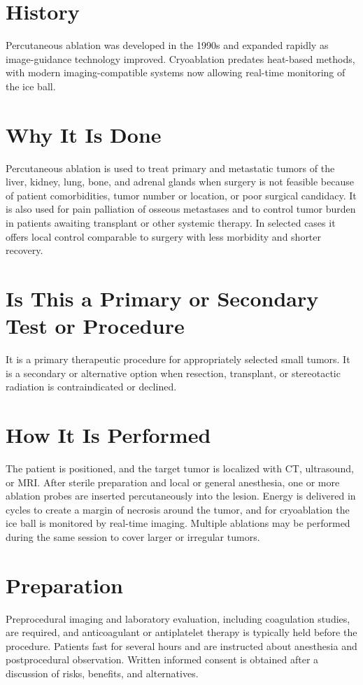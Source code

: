 \section*{History}
Percutaneous ablation was developed in the 1990s and expanded rapidly as image-guidance technology improved. Cryoablation predates heat-based methods, with modern imaging-compatible systems now allowing real-time monitoring of the ice ball.

\section*{Why It Is Done}
Percutaneous ablation is used to treat primary and metastatic tumors of the liver, kidney, lung, bone, and adrenal glands when surgery is not feasible because of patient comorbidities, tumor number or location, or poor surgical candidacy. It is also used for pain palliation of osseous metastases and to control tumor burden in patients awaiting transplant or other systemic therapy. In selected cases it offers local control comparable to surgery with less morbidity and shorter recovery.

\section*{Is This a Primary or Secondary Test or Procedure}
It is a primary therapeutic procedure for appropriately selected small tumors. It is a secondary or alternative option when resection, transplant, or stereotactic radiation is contraindicated or declined.

\section*{How It Is Performed}
The patient is positioned, and the target tumor is localized with CT, ultrasound, or MRI. After sterile preparation and local or general anesthesia, one or more ablation probes are inserted percutaneously into the lesion. Energy is delivered in cycles to create a margin of necrosis around the tumor, and for cryoablation the ice ball is monitored by real-time imaging. Multiple ablations may be performed during the same session to cover larger or irregular tumors.

\section*{Preparation}
Preprocedural imaging and laboratory evaluation, including coagulation studies, are required, and anticoagulant or antiplatelet therapy is typically held before the procedure. Patients fast for several hours and are instructed about anesthesia and postprocedural observation. Written informed consent is obtained after a discussion of risks, benefits, and alternatives.

